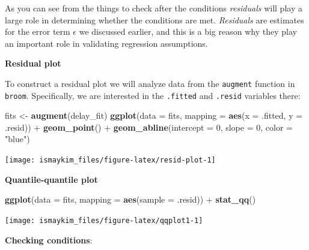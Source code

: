 \documentclass[]{tufte-book}
\newenvironment{Shaded}{\begin{snugshade}}{\end{snugshade}}
\newcommand{\KeywordTok}[1]{\textcolor[rgb]{0.13,0.29,0.53}{\textbf{{#1}}}}
\newcommand{\DataTypeTok}[1]{\textcolor[rgb]{0.13,0.29,0.53}{{#1}}}
\newcommand{\DecValTok}[1]{\textcolor[rgb]{0.00,0.00,0.81}{{#1}}}
\newcommand{\StringTok}[1]{\textcolor[rgb]{0.31,0.60,0.02}{{#1}}}
\newcommand{\NormalTok}[1]{{#1}}
\begin{document}
As you can see from the things to check after the conditions
\emph{residuals} will play a large role in determining whether the
conditions are met. \emph{Residuals} are estimates for the error term
\(\epsilon\) we discussed earlier, and this is a big reason why they
play an important role in validating regression assumptions.

\textbf{Residual plot}

To construct a residual plot we will analyze data from the
\texttt{augment} function in \texttt{broom}. Specifically, we are
interested in the \texttt{.fitted} and \texttt{.resid} variables there:

\begin{Shaded}
\begin{Highlighting}[]
\NormalTok{fits <-}\StringTok{ }\KeywordTok{augment}\NormalTok{(delay_fit)}
\KeywordTok{ggplot}\NormalTok{(}\DataTypeTok{data =} \NormalTok{fits, }\DataTypeTok{mapping =} \KeywordTok{aes}\NormalTok{(}\DataTypeTok{x =} \NormalTok{.fitted, }\DataTypeTok{y =} \NormalTok{.resid)) +}
\StringTok{  }\KeywordTok{geom_point}\NormalTok{() +}
\StringTok{  }\KeywordTok{geom_abline}\NormalTok{(}\DataTypeTok{intercept =} \DecValTok{0}\NormalTok{, }\DataTypeTok{slope =} \DecValTok{0}\NormalTok{, }\DataTypeTok{color =} \StringTok{"blue"}\NormalTok{)}
\end{Highlighting}
\end{Shaded}

\begin{center}\texttt{[image: ismaykim\_files/figure-latex/resid-plot-1]} \end{center}

\textbf{Quantile-quantile plot}

\begin{Shaded}
\begin{Highlighting}[]
\KeywordTok{ggplot}\NormalTok{(}\DataTypeTok{data =} \NormalTok{fits, }\DataTypeTok{mapping =} \KeywordTok{aes}\NormalTok{(}\DataTypeTok{sample =} \NormalTok{.resid)) +}
\StringTok{  }\KeywordTok{stat_qq}\NormalTok{()}
\end{Highlighting}
\end{Shaded}

\begin{center}\texttt{[image: ismaykim\_files/figure-latex/qqplot1-1]} \end{center}

\textbf{Checking conditions}:
\end{document}

